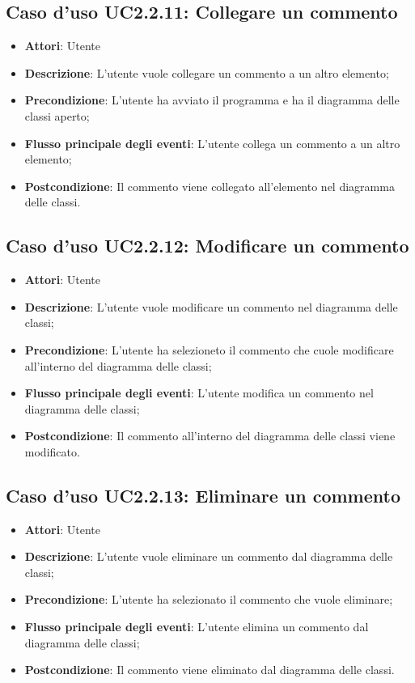 \documentclass[../AnalisiDeiRequisiti.tex]{subfiles}
\begin{document}
			\subsection{Caso d'uso UC2.2.11: Collegare un commento}
			\begin{itemize}
				\item \textbf{Attori}: Utente
				\item \textbf{Descrizione}: L'utente vuole collegare un commento a un altro elemento;
				\item \textbf{Precondizione}: L'utente ha avviato il programma e ha il diagramma delle classi aperto;
				\item \textbf{Flusso principale degli eventi}: L'utente collega un commento a un altro elemento;
				\item \textbf{Postcondizione}: Il commento viene collegato all'elemento nel diagramma delle classi.
			\end{itemize}
			\subsection{Caso d'uso UC2.2.12: Modificare un commento}
			\begin{itemize}
				\item \textbf{Attori}: Utente
				\item \textbf{Descrizione}: L'utente vuole modificare un commento nel diagramma delle classi;
				\item \textbf{Precondizione}: L'utente ha selezioneto il commento che cuole modificare all'interno del diagramma delle classi;
				\item \textbf{Flusso principale degli eventi}: L'utente modifica un commento nel diagramma delle classi;
				\item \textbf{Postcondizione}: Il commento all'interno del diagramma delle classi viene modificato.
			\end{itemize}
			\subsection{Caso d'uso UC2.2.13: Eliminare un commento}
			\begin{itemize}
				\item \textbf{Attori}: Utente
				\item \textbf{Descrizione}: L'utente vuole eliminare un commento dal diagramma delle classi;
				\item \textbf{Precondizione}: L'utente ha selezionato il commento che vuole eliminare;
				\item \textbf{Flusso principale degli eventi}: L'utente elimina un commento dal diagramma delle classi;
				\item \textbf{Postcondizione}: Il commento viene eliminato dal diagramma delle classi.
			\end{itemize}
\end{document}
